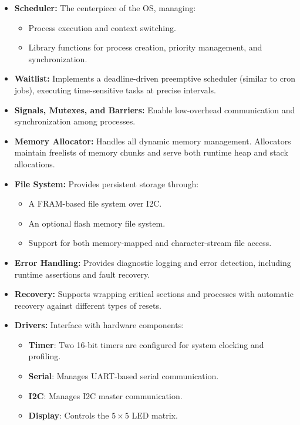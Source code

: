 \begin{itemize}[left=0em]
    \item \textbf{Scheduler:} The centerpiece of the OS, managing:
        \begin{itemize}[left=0pt]
            \item Process execution and context switching.
            \item Library functions for process creation, priority management, and
                synchronization.
        \end{itemize}

    \item \textbf{Waitlist:} Implements a deadline-driven preemptive scheduler (similar to cron
        jobs), executing time-sensitive tasks at precise intervals.

    \item \textbf{Signals, Mutexes, and Barriers:} Enable low-overhead communication
        and synchronization among processes.

    \item \textbf{Memory Allocator:} Handles all dynamic memory management. Allocators maintain
        freelists of memory chunks and serve both runtime heap and stack allocations.

    \item \textbf{File System:} Provides persistent storage through:
        \begin{itemize}[left=0pt]
            \item A FRAM-based file system over I2C.
            \item An optional flash memory file system.
            \item Support for both memory-mapped and character-stream file access.
        \end{itemize}

    \item \textbf{Error Handling:} Provides diagnostic logging and error detection, including
        runtime assertions and fault recovery.

    \item \textbf{Recovery:} Supports wrapping critical sections and processes with automatic
        recovery against different types of resets.

    \item \textbf{Drivers:} Interface with hardware components:
        \begin{itemize}[left=0pt]
            \item \textbf{Timer}: Two 16-bit timers are configured for system clocking
                and profiling.
            \item \textbf{Serial}: Manages UART-based serial communication.
            \item \textbf{I2C}: Manages I2C master communication.
            \item \textbf{Display}: Controls the \(5 \times 5\) LED matrix.
        \end{itemize}


\end{itemize}
